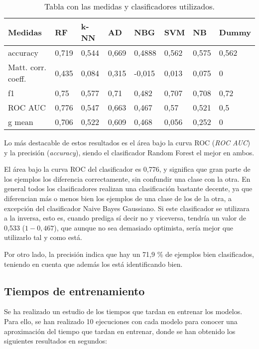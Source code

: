 \begin{table}[h]
	\begin{center}
		\begin{tabular}{ l l l l l l l l }
			\toprule
			\textbf{Medidas} & \textbf{RF} & \textbf{k-NN} & \textbf{AD} & \textbf{NBG} & \textbf{SVM} & \textbf{NB} & \textbf{Dummy} \\ \midrule
			accuracy & 0,719 & 0,544 & 0,669& 0,4888 & 0,562 & 0,575 & 0,562 \\
			Matt. corr. coeff. & 0,435 & 0,084 & 0,315 & -0,015 & 0,013 & 0,075 & 0 \\ 
			f1 & 0,75 & 0,577 & 0,71 & 0,482 & 0,707 & 0,708 & 0,72 \\
			ROC AUC & 0,776 & 0,547 & 0,663& 0,467 & 0,57 & 0,521 & 0,5 \\
			g mean & 0,706 & 0,522 & 0,609 & 0,468 & 0,056 & 0,252 & 0 \\ \bottomrule
		\end{tabular}
		\caption{Tabla con las medidas y clasificadores utilizados.}
		\label{tab:medidas}
	\end{center}
\end{table}

Lo más destacable de estos resultados es el área bajo la curva ROC (\textit{ROC AUC}) y la precisión (\textit{accuracy}), siendo el clasificador Random Forest el mejor en ambos.

El área bajo la curva ROC del clasificador es 0,776, y significa que gran parte de los ejemplos los diferencia correctamente, sin confundir una clase con la otra. En general todos los clasificadores realizan una clasificación bastante decente, ya que diferencian más o menos bien los ejemplos de una clase de los de la otra, a excepción del clasificador Naive Bayes Gaussiano. Si este clasificador se utilizara a la inversa, esto es, cuando prediga sí decir no y viceversa, tendría un valor de 0,533 ($1 - 0,467$), que aunque no sea demasiado optimista, sería mejor que utilizarlo tal y como está.

Por otro lado, la precisión indica que hay un 71,9 \% de ejemplos bien clasificados, teniendo en cuenta que además los está identificando bien. 

\subsection{Tiempos de entrenamiento}
Se ha realizado un estudio de los tiempos que tardan en entrenar los modelos. Para ello, se han realizado 10 ejecuciones con cada modelo para conocer una aproximación del tiempo que tardan en entrenar, donde se han obtenido los siguientes resultados en segundos:


